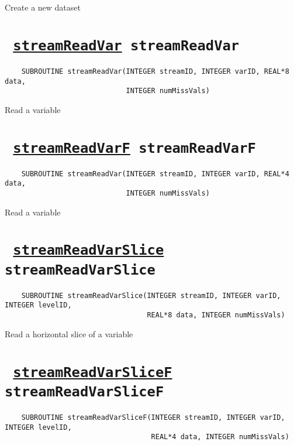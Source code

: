 Create a new dataset
\ifpdfoutput{}{(\ref{streamOpenWrite})}


\section*{\texttt{ 
\ifpdf
\hyperref[streamReadVar]{streamReadVar}
\else
streamReadVar
\fi
}}
\begin{verbatim}
    SUBROUTINE streamReadVar(INTEGER streamID, INTEGER varID, REAL*8 data, 
                             INTEGER numMissVals)
\end{verbatim}

Read a variable
\ifpdfoutput{}{(\ref{streamReadVar})}


\section*{\texttt{ 
\ifpdf
\hyperref[streamReadVarF]{streamReadVarF}
\else
streamReadVarF
\fi
}}
\begin{verbatim}
    SUBROUTINE streamReadVar(INTEGER streamID, INTEGER varID, REAL*4 data, 
                             INTEGER numMissVals)
\end{verbatim}

Read a variable
\ifpdfoutput{}{(\ref{streamReadVarF})}


\section*{\texttt{ 
\ifpdf
\hyperref[streamReadVarSlice]{streamReadVarSlice}
\else
streamReadVarSlice
\fi
}}
\begin{verbatim}
    SUBROUTINE streamReadVarSlice(INTEGER streamID, INTEGER varID, INTEGER levelID, 
                                  REAL*8 data, INTEGER numMissVals)
\end{verbatim}

Read a horizontal slice of a variable
\ifpdfoutput{}{(\ref{streamReadVarSlice})}


\section*{\texttt{ 
\ifpdf
\hyperref[streamReadVarSliceF]{streamReadVarSliceF}
\else
streamReadVarSliceF
\fi
}}
\begin{verbatim}
    SUBROUTINE streamReadVarSliceF(INTEGER streamID, INTEGER varID, INTEGER levelID, 
                                   REAL*4 data, INTEGER numMissVals)
\end{verbatim}


